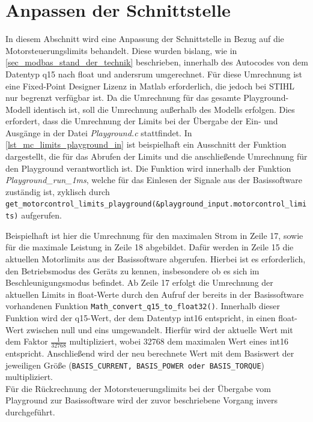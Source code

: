 \section{Anpassen der Schnittstelle}
In diesem Abschnitt wird eine Anpassung der Schnittstelle in Bezug auf die Motorsteuerungslimits behandelt. Diese wurden bislang, wie in \autoref{sec_modbas_stand_der_technik} beschrieben, innerhalb des Autocodes von dem Datentyp q15 nach float und andersrum umgerechnet. Für diese Umrechnung ist eine Fixed-Point Designer Lizenz in Matlab erforderlich, die jedoch bei STIHL nur begrenzt verfügbar ist. Da die Umrechnung für das gesamte Playground-Modell identisch ist, soll die Umrechnung außerhalb des Modells erfolgen. Dies erfordert, dass die Umrechnung der Limits bei der Übergabe der Ein- und Ausgänge in der Datei \textit{Playground.c} stattfindet. In \autoref{lst_mc_limits_playground_in} ist beispielhaft ein Ausschnitt der Funktion dargestellt, die für das Abrufen der Limits und die anschließende Umrechnung für den Playground verantwortlich ist. Die Funktion wird innerhalb der Funktion \textit{Playground\_run\_1ms}, welche für das Einlesen der Signale aus der Basissoftware zuständig ist, zyklisch durch \lstinline{get_motorcontrol_limits_playground(&playground_input.motorcontrol_limits)} aufgerufen.
 
Beispielhaft ist hier die Umrechnung für den maximalen Strom in Zeile 17, sowie für die maximale Leistung in Zeile 18 abgebildet. Dafür werden in Zeile 15 die aktuellen Motorlimits aus der Basissoftware abgerufen. Hierbei ist es erforderlich, den Betriebsmodus des Geräts zu kennen, insbesondere ob es sich im Beschleunigungsmodus befindet. Ab Zeile 17 erfolgt die Umrechnung der aktuellen Limits in float-Werte durch den Aufruf der bereits in der Basissoftware vorhandenen Funktion \lstinline{Math_convert_q15_to_float32()}. Innerhalb dieser Funktion wird der q15-Wert, der dem Datentyp int16 entspricht, in einen float-Wert zwischen null und eins umgewandelt. Hierfür wird der aktuelle Wert mit dem Faktor $\frac{1}{32768}$ multipliziert, wobei 32768 dem maximalen Wert eines int16 entspricht. Anschließend wird der neu berechnete Wert mit dem Basiswert der jeweiligen Größe (\lstinline{BASIS_CURRENT, BASIS_POWER oder BASIS_TORQUE}) multipliziert. \\
Für die Rückrechnung der Motorsteuerungslimits bei der Übergabe vom Playground zur Basissoftware wird der zuvor beschriebene Vorgang invers durchgeführt.
